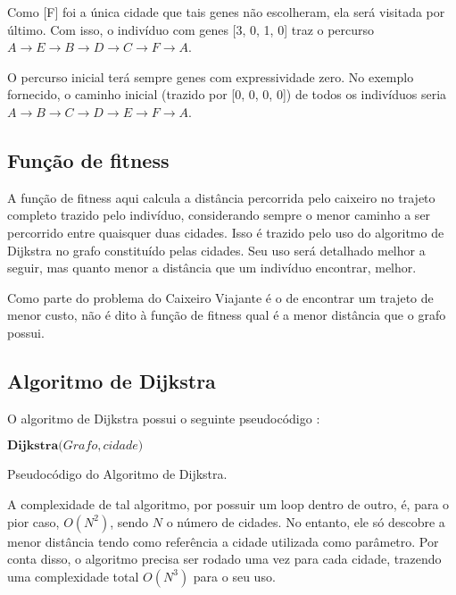 Como [F] foi a única cidade que tais genes não escolheram, ela será visitada por último. Com isso, o indivíduo com genes [3, 0, 1, 0] traz o percurso $A \rightarrow E \rightarrow B \rightarrow D \rightarrow C \rightarrow F \rightarrow A$.

O percurso inicial terá sempre genes com expressividade zero. No exemplo fornecido, o caminho inicial (trazido por [0, 0, 0, 0]) de todos os indivíduos seria $A \rightarrow B \rightarrow C \rightarrow D \rightarrow E \rightarrow F \rightarrow A$.

\subsection*{Função de fitness}

A função de fitness aqui calcula a distância percorrida pelo caixeiro no trajeto completo trazido pelo indivíduo, considerando sempre o menor caminho a ser percorrido entre quaisquer duas cidades. Isso é trazido pelo uso do algoritmo de Dijkstra \cite{dijkstra1959note} no grafo constituído pelas cidades. Seu uso será detalhado melhor a seguir, mas quanto menor a distância que um indivíduo encontrar, melhor.

Como parte do problema do Caixeiro Viajante é o de encontrar um trajeto de menor custo, não é dito à função de fitness qual é a menor distância que o grafo possui.

\subsection*{Algoritmo de Dijkstra}

O algoritmo de Dijkstra possui o seguinte pseudocódigo \cite{cormen2001dijkstra}:

\begin{algorithm}[H]
$\textbf{Dijkstra(} Grafo, cidade \textbf{)}$
\caption{Pseudocódigo do Algoritmo de Dijkstra.}
\label{alg:dijkstra}
\end{algorithm}

A complexidade de tal algoritmo, por possuir um loop dentro de outro, é, para o pior caso, $O(N^2)$, sendo $N$ o número de cidades. No entanto, ele só descobre a menor distância tendo como referência a cidade utilizada como parâmetro. Por conta disso, o algoritmo precisa ser rodado uma vez para cada cidade, trazendo uma complexidade total $O(N^3)$ para o seu uso.

